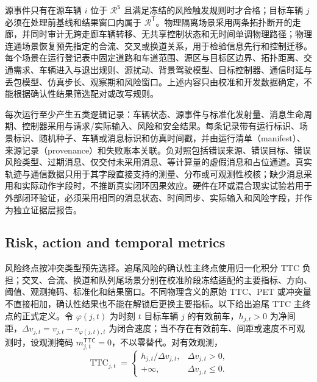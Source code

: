 \documentclass[10pt,a4paper,twocolumn]{article}
\begin{document}
源事件只有在源车辆 $i$ 位于 $\mathcal R^{\mathsf S}$ 且满足冻结的风险触发规则时才合格；目标车辆 $j$ 必须在处理前基线和结果窗口内属于 $\mathcal R^{\mathsf T}$。物理隔离场景采用两条拓扑断开的走廊，并同时审计无跨走廊车辆转移、无共享控制状态和无时间单调物理路径；物理连通场景恢复预先指定的合流、交叉或换道关系，用于检验信息先行和控制迁移。每个场景在运行登记表中固定道路和车道范围、源区与目标区边界、拓扑距离、交通需求、车辆进入与退出规则、源扰动、背景驾驶模型、目标控制器、通信时延与丢包模型、仿真步长、观察期和风险窗口。上述内容只由校准和开发数据确定，不能根据确认性结果筛选配对或改写规则。

每次运行至少产生五类逻辑记录：车辆状态、源事件与标准化发射量、消息生命周期、控制器采用与请求/实际输入、风险和安全结果。每条记录带有运行标识、场景标识、随机种子、车辆或消息标识和仿真时间戳，并由运行清单（manifest）、来源记录（provenance）和失败账本关联。负对照包括错误来源、错误目标、错误风险类型、过期消息、仅交付未采用消息、等计算量的虚假消息和占位通道。真实轨迹与通信数据只用于其字段直接支持的测量、分布或可观测性校核\cite{ngsim2016dataset,coifman2017ngsim,barmpounakis2020pneuma,pneuma2024dataset,spmd2014dataset,zhan2019interaction}；缺少消息采用和实际动作字段时，不推断真实闭环因果效应。硬件在环或混合现实试验若用于外部闭环验证，必须采用相同的消息状态、时间同步、实际输入和风险字段，并作为独立证据层报告。

\subsection*{Risk, action and temporal metrics}
风险终点按冲突类型预先选择。追尾风险的确认性主终点使用归一化积分 TTC 负担；交叉、合流、换道和队列尾场景分别在校准阶段冻结适配的主要指标、方向、阈值、观测掩码、标准化和结果窗口。不同物理含义的原始 TTC、PET 或冲突量不直接相加，确认性结果也不能在解锁后更换主要指标。以下给出追尾 TTC 主终点的正式定义。令 $\varphi(j,t)$ 为时刻 $t$ 目标车辆 $j$ 的有效前车，$h_{j,t}>0$ 为净间距，$\Delta v_{j,t}=v_{j,t}-v_{\varphi(j,t),t}$ 为闭合速度；当不存在有效前车、间距或速度不可观测时，设观测掩码 $m_{j,t}^{\mathsf{TTC}}=0$，不以零替代。对有效观测，
\begin{equation*}
\operatorname{TTC}_{j,t}=
\begin{cases}
h_{j,t}/\Delta v_{j,t},&\Delta v_{j,t}>0,\\
+\infty,&\Delta v_{j,t}\leq 0.
\end{cases}
\end{equation*}
\end{document}
